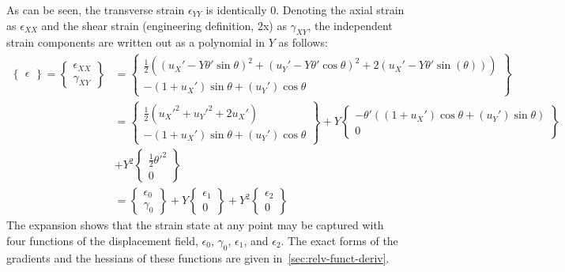 \documentclass[10pt]{article}
\begin{document}
As can be seen, the transverse strain $\epsilon_{YY}$ is identically
0. Denoting the axial strain as $\epsilon_{XX}$ and the shear strain
(engineering definition, 2x) as $\gamma_{XY}$, the independent strain
components are written out as a polynomial in $Y$ as follows:
\begin{align}
  \begin{Bmatrix}\epsilon\end{Bmatrix} = \begin{Bmatrix} \epsilon_{XX}\\\gamma_{XY} \end{Bmatrix}
  &= \begin{Bmatrix}
    \frac{1}{2}\left({(u_X'-Y\theta'\sin\theta)}^2+{(u_Y'-Y\theta'\cos\theta)}^2+2(u_X'-Y\theta'\sin(\theta))\right)\\-(1+u_X')\sin\theta+(u_Y')\cos\theta \end{Bmatrix}\nonumber\\
  &= \begin{Bmatrix}
    \frac{1}{2}\left({u_X'}^2+{u_Y'}^2+2u_X'\right)\\-(1+u_X')\sin\theta+(u_Y')\cos\theta \end{Bmatrix}
  + Y\begin{Bmatrix}
    -\theta'\left((1+u_X')\cos\theta+(u_Y')\sin\theta\right)\\0 \end{Bmatrix}\nonumber\\
  &+ Y^2\begin{Bmatrix}
    \frac{1}{2}{\theta'}^2\\0 \end{Bmatrix}\nonumber\\
  &= \begin{Bmatrix}\epsilon_0\\\gamma_0\end{Bmatrix} +
  Y\begin{Bmatrix} \epsilon_1\\0 \end{Bmatrix} + Y^2\begin{Bmatrix}
    \epsilon_2\\0 \end{Bmatrix}
  \label{eq:strainexp}
\end{align}
The expansion shows that the strain state at any point may be captured
with four functions of the displacement field, $\epsilon_0$,
$\gamma_0$, $\epsilon_1$, and $\epsilon_2$. The exact forms of the
gradients and the hessians of these functions are given
in~\cref{sec:relv-funct-deriv}.
\end{document}
